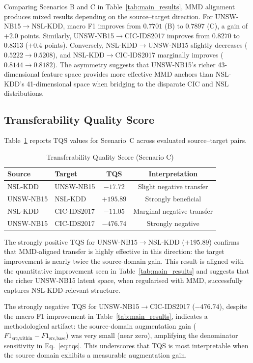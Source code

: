 \documentclass[conference]{IEEEtran}
\begin{document}
Comparing Scenarios B and C in Table~\ref{tab:main_results}, MMD alignment
produces mixed results depending on the source--target direction.
For UNSW-NB15$\to$NSL-KDD, macro F1 improves from $0.7701$ (B) to
$0.7897$ (C), a gain of $+2.0$ points.
Similarly, UNSW-NB15$\to$CIC-IDS2017 improves from $0.8270$ to $0.8313$
($+0.4$ points).
Conversely, NSL-KDD$\to$UNSW-NB15 slightly decreases ($0.5222 \to 0.5208$),
and NSL-KDD$\to$CIC-IDS2017 marginally improves ($0.8144 \to 0.8182$).
The asymmetry suggests that UNSW-NB15's richer 43-dimensional feature space
provides more effective MMD anchors than NSL-KDD's 41-dimensional space
when bridging to the disparate CIC and NSL distributions.

\subsection{Transferability Quality Score}

Table~\ref{tab:tqs} reports TQS values for Scenario~C across evaluated
source--target pairs.

\begin{table}[htbp]
\caption{Transferability Quality Score (Scenario C)}
\label{tab:tqs}
\centering
\begin{tabular}{llcc}
\toprule
Source & Target & TQS & Interpretation \\
\midrule
NSL-KDD   & UNSW-NB15   & $-17.72$ & Slight negative transfer \\
UNSW-NB15 & NSL-KDD     & $+195.89$ & Strongly beneficial \\
NSL-KDD   & CIC-IDS2017 & $-11.05$ & Marginal negative transfer \\
UNSW-NB15 & CIC-IDS2017 & $-476.74$ & Strongly negative \\
\bottomrule
\end{tabular}
\end{table}

The strongly positive TQS for UNSW-NB15$\to$NSL-KDD ($+195.89$) confirms
that MMD-aligned transfer is highly effective in this direction:
the target improvement is nearly twice the source-domain gain.
This result is aligned with the quantitative improvement seen in
Table~\ref{tab:main_results} and suggests that the richer UNSW-NB15
latent space, when regularised with MMD, successfully captures
NSL-KDD-relevant structure.

The strongly negative TQS for UNSW-NB15$\to$CIC-IDS2017 ($-476.74$),
despite the macro F1 improvement in Table~\ref{tab:main_results},
indicates a methodological artifact: the source-domain augmentation
gain ($F1_{\text{src,within}} - F1_{\text{src,base}}$) was very small
(near zero), amplifying the denominator sensitivity in Eq.~\eqref{eq:tqs}.
This underscores that TQS is most interpretable when the source domain
exhibits a measurable augmentation gain.
\end{document}

